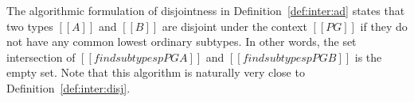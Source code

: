 \noindent The algorithmic formulation of disjointness in
Definition~\ref{def:inter:ad} states that two
types $[[A]]$ and $[[B]]$ are disjoint under the context $[[PG]]$
if they do not have any common lowest ordinary subtypes.
In other words, the
set intersection of $[[findsubtypesp PG A]]$ and $[[findsubtypesp PG B]]$ is the empty set.
Note that this algorithm is naturally very close to Definition~\ref{def:inter:disj}.
\begin{comment}
We illustrate \Cref{def:inter:ad} with a few examples:

\begin{enumerate}
  \item $\boldsymbol{A = [[Int]], \ B = \ [[A -> B]]:}$ \\
        $[[findsubtypes Int]]$ returns \{$[[Int]]$\} and $[[findsubtypes A -> B]]$ returns
        \{$[[Top -> Bot]]$\}. Set intersection of \{$[[Int]]$\} and \{$[[Top -> Bot]]$\} is
        empty set \{\}. Therefore, $[[Int]]$ and $[[A -> B]]$ are disjoint types.
  \item $\boldsymbol{A = [[Int]], \ B = \ [[Bot]]:}$ \\
        $[[findsubtypes Int]]$ returns \{$[[Int]]$\} and $[[findsubtypes Bot]]$ returns
        \{\}. Set intersection of \{$[[Int]]$\} and \{\} is
        empty set \{\}. Therefore, $[[Int]]$ and $[[Bot]]$ are disjoint types.
        In general, type $[[Bot]]$ is disjoint to all types because $[[findsubtypes Bot]]$
        will always return \{\} and intersection of \{\} with all other sets is \{\}.
  \item $\boldsymbol{A = [[Int /\ A -> B]], \ B = \ [[Int]]:}$ \\
        $[[findsubtypes Int /\ A -> B]]$ returns \{\} and $[[findsubtypes Int]]$ returns
        \{$[[Int]]$\}. Set intersection of \{\} and \{$[[Int]]$\} is
        empty set \{\}. Therefore, $[[Int /\ A -> B]]$ and $[[Int]]$ are disjoint types.
        In general, intersection type of two disjoint types which is $[[Int /\ A -> B]]$ in this case,
        is always disjoint to all types.
  \item $\boldsymbol{A = [[Int]], \ B = \ [[Top]]:}$ \\
        $[[findsubtypes Int]]$ returns \{$[[Int]]$\} and $[[findsubtypes Top]]$ returns
        \{$[[Int]]$, $[[Top -> Bot]]$\}.
        Set intersection of \{$[[Int]]$\} and \{$[[Int]]$, $[[Top -> Bot]]$\} is
        set \{$[[Int]]$\}. Therefore, $[[Int]]$ and $[[Top]]$ are not disjoint types.
\end{enumerate}
\end{comment}

